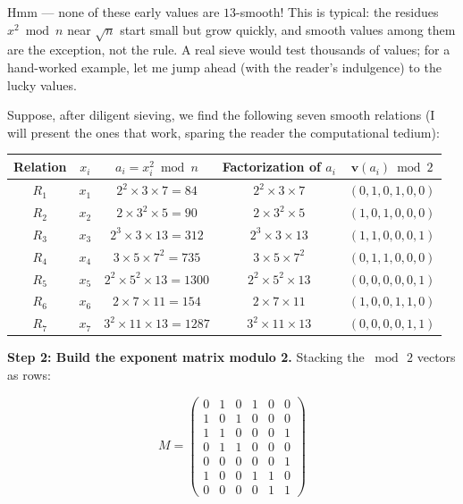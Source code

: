 \documentclass[11pt,openany]{book}
\theoremstyle{definition}
\theoremstyle{plain}
\theoremstyle{remark}
\begin{document}
Hmm — none of these early values are $13$-smooth! This is typical: the residues $x^2 \bmod n$ near $\sqrt{n}$ start small but grow quickly, and smooth values among them are the exception, not the rule. A real sieve would test thousands of values; for a hand-worked example, let me jump ahead (with the reader's indulgence) to the lucky values.

Suppose, after diligent sieving, we find the following seven smooth relations (I will present the ones that work, sparing the reader the computational tedium):

\begin{center}
\begin{tabular}{c|c|c|c|c}
\toprule
Relation & $x_i$ & $a_i = x_i^2 \bmod n$ & Factorization of $a_i$ & $\mathbf{v}(a_i) \bmod 2$ \\
\midrule
$R_1$ & $x_1$ & $2^2 \times 3 \times 7 = 84$ & $2^2 \times 3 \times 7$ & $(0, 1, 0, 1, 0, 0)$ \\
$R_2$ & $x_2$ & $2 \times 3^2 \times 5 = 90$ & $2 \times 3^2 \times 5$ & $(1, 0, 1, 0, 0, 0)$ \\
$R_3$ & $x_3$ & $2^3 \times 3 \times 13 = 312$ & $2^3 \times 3 \times 13$ & $(1, 1, 0, 0, 0, 1)$ \\
$R_4$ & $x_4$ & $3 \times 5 \times 7^2 = 735$ & $3 \times 5 \times 7^2$ & $(0, 1, 1, 0, 0, 0)$ \\
$R_5$ & $x_5$ & $2^2 \times 5^2 \times 13 = 1300$ & $2^2 \times 5^2 \times 13$ & $(0, 0, 0, 0, 0, 1)$ \\
$R_6$ & $x_6$ & $2 \times 7 \times 11 = 154$ & $2 \times 7 \times 11$ & $(1, 0, 0, 1, 1, 0)$ \\
$R_7$ & $x_7$ & $3^2 \times 11 \times 13 = 1287$ & $3^2 \times 11 \times 13$ & $(0, 0, 0, 0, 1, 1)$ \\
\bottomrule
\end{tabular}
\end{center}


\textbf{Step 2: Build the exponent matrix modulo 2.} Stacking the $\bmod\, 2$ vectors as rows:

$$M = \begin{pmatrix} 0 & 1 & 0 & 1 & 0 & 0 \\ 1 & 0 & 1 & 0 & 0 & 0 \\ 1 & 1 & 0 & 0 & 0 & 1 \\ 0 & 1 & 1 & 0 & 0 & 0 \\ 0 & 0 & 0 & 0 & 0 & 1 \\ 1 & 0 & 0 & 1 & 1 & 0 \\ 0 & 0 & 0 & 0 & 1 & 1 \end{pmatrix}$$
\end{document}
